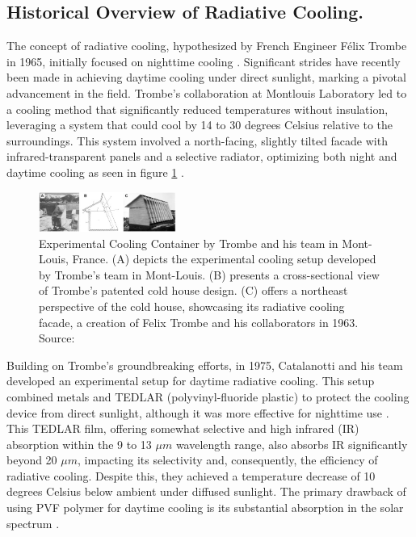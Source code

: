 \subsection{Historical Overview of Radiative Cooling.}
The concept of radiative cooling, hypothesized by French Engineer Félix Trombe in 1965, initially focused on nighttime cooling \cite{trombe_aspects_1965}. Significant strides have recently been made in achieving daytime cooling under direct sunlight, marking a pivotal advancement in the field. Trombe's collaboration at Montlouis Laboratory led to a cooling method that significantly reduced temperatures without insulation, leveraging a system that could cool by 14 to 30 degrees Celsius relative to the surroundings. This system involved a north-facing, slightly tilted facade with infrared-transparent panels and a selective radiator, optimizing both night and daytime cooling as seen in figure \ref{fig:Trombe_cooling_house} \cite{fortin_passive_2023}.

\begin{figure}[ht!]
  \centering
  \includegraphics[width=0.4\textwidth]{Chapters/Figures/Trombe PDRC Structure.png}
  \caption[Experimental Cooling Container by Trombe et al.]{Experimental Cooling Container by Trombe and his team in Mont-Louis, France. (A) depicts the experimental cooling setup developed by Trombe's team in Mont-Louis. (B) presents a cross-sectional view of Trombe’s patented cold house design. (C) offers a northeast perspective of the cold house, showcasing its radiative cooling facade, a creation of Felix Trombe and his collaborators in 1963. Source: \cite{fortin_passive_2023}}
  \label{fig:Trombe_cooling_house}
\end{figure}

Building on Trombe's groundbreaking efforts, in 1975, Catalanotti and his team developed an experimental setup for daytime radiative cooling. This setup combined metals and TEDLAR (polyvinyl-fluoride plastic) to protect the cooling device from direct sunlight, although it was more effective for nighttime use \cite{bijarniya_review_2020}. This TEDLAR film, offering somewhat selective and high infrared (IR) absorption within the 9 to 13 $\mu m$ wavelength range, also absorbs IR significantly beyond 20 $\mu m$, impacting its selectivity and, consequently, the efficiency of radiative cooling. Despite this, they achieved a temperature decrease of 10 degrees Celsius below ambient under diffused sunlight. The primary drawback of using PVF polymer for daytime cooling is its substantial absorption in the solar spectrum \cite{hossain_radiative_2016}.

